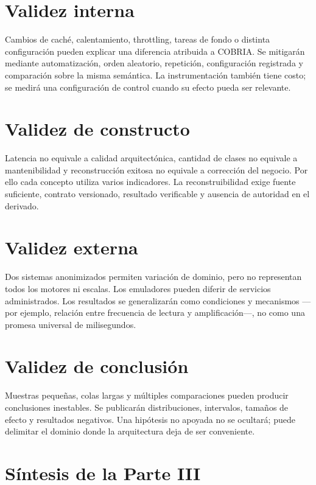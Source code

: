\section{Validez interna}

Cambios de caché, calentamiento, throttling, tareas de fondo o distinta configuración
pueden explicar una diferencia atribuida a COBRIA. Se mitigarán mediante automatización,
orden aleatorio, repetición, configuración registrada y comparación sobre la misma
semántica. La instrumentación también tiene costo; se medirá una configuración de
control cuando su efecto pueda ser relevante.

\section{Validez de constructo}

Latencia no equivale a calidad arquitectónica, cantidad de clases no equivale a
mantenibilidad y reconstrucción exitosa no equivale a corrección del negocio. Por ello
cada concepto utiliza varios indicadores. La reconstruibilidad exige fuente suficiente,
contrato versionado, resultado verificable y ausencia de autoridad en el derivado.

\section{Validez externa}

Dos sistemas anonimizados permiten variación de dominio, pero no representan todos los
motores ni escalas. Los emuladores pueden diferir de servicios administrados. Los
resultados se generalizarán como condiciones y mecanismos ---por ejemplo, relación entre
frecuencia de lectura y amplificación---, no como una promesa universal de milisegundos.

\section{Validez de conclusión}

Muestras pequeñas, colas largas y múltiples comparaciones pueden producir conclusiones
inestables. Se publicarán distribuciones, intervalos, tamaños de efecto y resultados
negativos. Una hipótesis no apoyada no se ocultará; puede delimitar el dominio donde la
arquitectura deja de ser conveniente.

\section{Síntesis de la Parte III}

